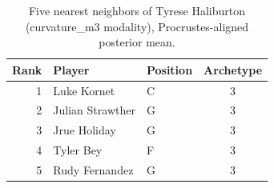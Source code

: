 \begin{table}[htbp]
  \centering\small
  \begin{tabular}{rllc}
    \toprule
    Rank & Player & Position & Archetype \\
    \midrule
    1 & Luke Kornet & C & 3 \\
    2 & Julian Strawther & G & 3 \\
    3 & Jrue Holiday & G & 3 \\
    4 & Tyler Bey & F & 3 \\
    5 & Rudy Fernandez & G & 3 \\
    \bottomrule
  \end{tabular}
  \caption{Five nearest neighbors of Tyrese Haliburton (curvature_m3 modality), Procrustes-aligned posterior mean.}
  \label{tab:Tyrese_Haliburton_neighbors_curvature_m3}
\end{table}

